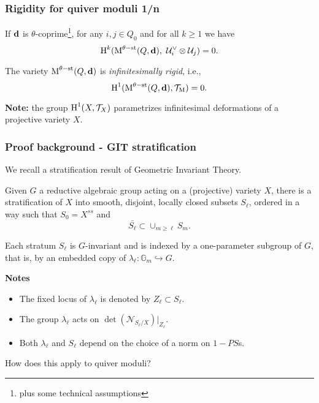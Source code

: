 \documentclass{beamer}
\begin{document}
\begin{frame}
    \frametitle{Rigidity for quiver moduli 1/n}
\begin{theorem}
If $\mathbf{d}$ is $\theta$-coprime\footnote{ plus some technical assumptions}, for any $i, j \in Q_0$ and for all $k \geq 1$ we have
\[\operatorname{H}^{k}(\operatorname{M}^{\theta-\mathrm{st}}(Q, \mathbf{d}),~\mathcal{U}^{\vee}_{i} \otimes \mathcal{U}_j) = 0. \]
\end{theorem} \pause
\begin{corollary}
The variety $\operatorname{M}^{\theta-\mathrm{st}}(Q, \mathbf{d})$ is \emph{infinitesimally rigid}, i.e.,
\[ \operatorname{H}^1(\operatorname{M}^{\theta-\mathrm{st}}(Q, \mathbf{d}), \mathcal{T}_{\operatorname{M}}) = 0. \]
\end{corollary} \pause

{\bf Note:} the group $\operatorname{H}^1(X, \mathcal{T}_{X})$ parametrizes infinitesimal
deformations of a projective variety $X$.
\end{frame}

\begin{frame}
    \frametitle{Proof background - GIT stratification}
We recall a stratification result of Geometric Invariant Theory. \pause
\begin{theorem}
Given $G$ a reductive algebraic group
acting on a (projective) variety $X$,
there is a stratification of $X$
into smooth, disjoint, locally closed subsets $S_{\ell}$,
ordered in a way such that $S_0 = X^{ss}$ and
\[\bar{S_{\ell}} \subset \cup_{m \geq \ell} S_m.\]
\end{theorem} \pause

Each stratum $S_{\ell}$ is $G$-invariant and is indexed by
a one-parameter subgroup of $G$,
that is, by an embedded copy of
$\lambda_{\ell} \colon \mathbb{G}_m \hookrightarrow G$. \pause

{\bf Notes} \pause
\begin{itemize}
    \item The fixed locus of $\lambda_{\ell}$ is denoted by $Z_{\ell} \subset S_{\ell}$. \pause
    \item The group $\lambda_{\ell}$ acts on $\det(\mathcal{N}_{S_{\ell}/X})|_{Z_{\ell}}$. \pause
    \item Both $\lambda_{\ell}$ and $S_{\ell}$ depend on the choice of a norm on $1-PS$s.
\end{itemize} \pause
How does this apply to quiver moduli?
\end{frame}
\end{document}
